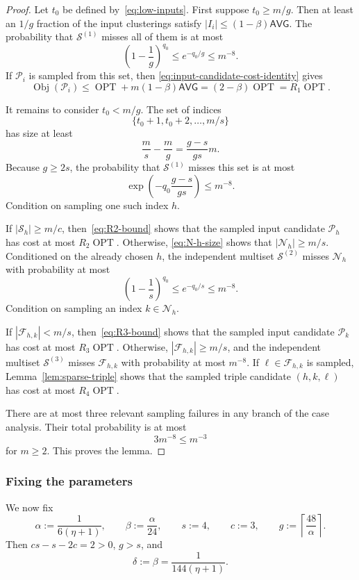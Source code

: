 \documentclass[11pt]{article}
\theoremstyle{definition}
\theoremstyle{remark}
\newcommand{\F}{\mathcal F}
\newcommand{\N}{\mathcal N}
\newcommand{\Pp}{\mathcal P}
\newcommand{\Sset}{\mathcal S}
\newcommand{\OPT}{\operatorname{OPT}}
\newcommand{\Obj}{\operatorname{Obj}}
\newcommand{\1}{\mathbf 1}
\begin{document}
\begin{proof}
Let $t_0$ be defined by~\eqref{eq:low-inputs}.  First suppose
$t_0\ge m/g$.  Then at least an $1/g$ fraction of the input clusterings
satisfy $|I_i|\le(1-\beta)\mathsf{AVG}$.  The probability that
$\Sset^{(1)}$ misses all of them is at most
\[
 \left(1-\frac1g\right)^{q_0}
 \le e^{-q_0/g}
 \le m^{-8}.
\]
If $\Pp_i$ is sampled from this set, then
\eqref{eq:input-candidate-cost-identity} gives
\[
 \Obj(\Pp_i)
 \le\OPT+m(1-\beta)\mathsf{AVG}
 =(2-\beta)\OPT
 =R_1\OPT.
\]

It remains to consider $t_0<m/g$.  The set of indices
\[
 \{t_0+1,t_0+2,\ldots,m/s\}
\]
has size at least
\[
 \frac{m}{s}-\frac{m}{g}
 =\frac{g-s}{gs}m.
\]
Because $g\ge2s$, the probability that $\Sset^{(1)}$ misses this set is at
most
\[
 \exp\!\left(-q_0\frac{g-s}{gs}\right)
 \le m^{-8}.
\]
Condition on sampling one such index $h$.

If $|\Sset_h|\ge m/c$, then~\eqref{eq:R2-bound} shows that the sampled input
candidate $\Pp_h$ has cost at most $R_2\OPT$.  Otherwise,
\eqref{eq:N-h-size} shows that $|\N_h|\ge m/s$.  Conditioned on the already
chosen $h$, the independent multiset $\Sset^{(2)}$ misses $\N_h$ with
probability at most
\[
 \left(1-\frac1s\right)^{q_0}
 \le e^{-q_0/s}
 \le m^{-8}.
\]
Condition on sampling an index $k\in\N_h$.

If $|\F_{h,k}|<m/s$, then~\eqref{eq:R3-bound} shows that the sampled input
candidate $\Pp_k$ has cost at most $R_3\OPT$.  Otherwise,
$|\F_{h,k}|\ge m/s$, and the independent multiset $\Sset^{(3)}$ misses
$\F_{h,k}$ with probability at most $m^{-8}$.  If
$\ell\in\F_{h,k}$ is sampled, Lemma~\ref{lem:sparse-triple} shows that the
sampled triple candidate $(h,k,\ell)$ has cost at most $R_4\OPT$.

There are at most three relevant sampling failures in any branch of the
case analysis.  Their total probability is at most
\[
 3m^{-8}\le m^{-3}
\]
for $m\ge2$.  This proves the lemma.
\end{proof}

\subsubsection{Fixing the parameters}

We now fix
\begin{equation}\label{eq:parameter-choice}
 \alpha:=\frac{1}{6(\eta+1)},
 \qquad
 \beta:=\frac{\alpha}{24},
 \qquad
 s:=4,
 \qquad
 c:=3,
 \qquad
 g:=\left\lceil\frac{48}{\alpha}\right\rceil.
\end{equation}
Then $cs-s-2c=2>0$, $g>s$, and
\begin{equation}\label{eq:delta-definition}
 \delta:=\beta
 =\frac{1}{144(\eta+1)}.
\end{equation}
\end{document}
